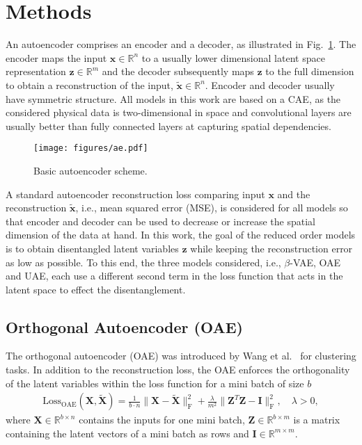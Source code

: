 \section{Methods}
\label{sec:2}

An autoencoder comprises an encoder and a decoder, as illustrated in Fig.~\ref{fig:ae}. The encoder maps the input $\mathbf{x}\in\mathbb{R}^n$ to a usually lower dimensional latent space representation $\mathbf{z}\in\mathbb{R}^m$ and the decoder subsequently maps  $\mathbf{z}$ to the full dimension to obtain a reconstruction of the input, $\tilde{\mathbf{x}}\in\mathbb{R}^n$. Encoder and decoder usually have symmetric structure. 
All models in this work are based on a CAE, as the considered physical data is two-dimensional in space and convolutional layers are usually better than fully connected layers at capturing spatial dependencies.
\begin{figure}[!h]
     \centering
     \texttt{[image: figures/ae.pdf]}
    \caption{Basic autoencoder scheme.}
    \label{fig:ae}
\end{figure}

  A standard autoencoder reconstruction loss comparing input $\mathbf{x}$ and the reconstruction $\tilde{\mathbf{x}}$, i.e., mean squared error (MSE), is considered for all models so that encoder and decoder can be used to decrease or increase the spatial dimension of the data at hand. 
%
In this work, the goal of the reduced order models is to obtain disentangled latent variables $\mathbf{z}$ while keeping the reconstruction error as low as possible. To this end, the three models considered, i.e., $\beta$-VAE, OAE and UAE, each use a different second term in the loss function that acts in the latent space to effect the disentanglement. 

\subsection{Orthogonal Autoencoder (OAE)}
The orthogonal autoencoder (OAE) was introduced by Wang et al.~\cite{wang:2019} for clustering tasks. In addition to the reconstruction loss, the OAE enforces the orthogonality of the latent variables within the loss function for a mini batch of size $b$
\begin{align}
    \mathrm{Loss_{OAE}}(\mathbf{X},\tilde{\mathbf{X}}) =
    \frac{1}{b\cdot n}\lVert \mathbf{X} - \tilde{\mathbf{X}} \rVert^2_\mathrm{F} + 
    \frac{\lambda}{m^2}\lVert \mathbf{Z}^T \mathbf{Z} - \mathbf{I} \rVert^2_\mathrm{F}, \quad \lambda>0,
    \label{eq:oae_loss}
\end{align}
where $\mathbf{X}\in \mathbb{R}^{b\times n}$ contains the inputs for one mini batch, $\mathbf{Z} \in \mathbb{R}^{b\times m}$ is a matrix containing the latent vectors of a mini batch as rows and $\mathbf{I} \in \mathbb{R}^{m\times m}$.

